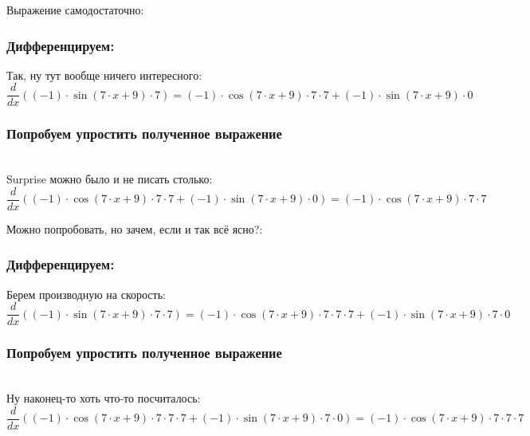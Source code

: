 \documentclass[a4paper,12pt]{article}
\begin{document}
Выражение самодостаточно:

\subsubsection*{Дифференцируем:}

Так, ну тут вообще ничего интересного:
\begin{dmath}\frac{d}{dx}\left((-1)\cdot \operatorname{sin}\left(7\cdot x+ 9\right) \cdot 7\right)=(-1)\cdot \operatorname{cos}\left(7\cdot x+ 9\right) \cdot 7\cdot 7+ (-1)\cdot \operatorname{sin}\left(7\cdot x+ 9\right) \cdot 0\end{dmath}
\subsubsection*{Попробуем упростить полученное выражение}
\\Surprise можно было и не писать столько:\\
\begin{dmath}
	\frac{d}{dx}\left((-1)\cdot \operatorname{cos}\left(7\cdot x+ 9\right) \cdot 7\cdot 7+ (-1)\cdot \operatorname{sin}\left(7\cdot x+ 9\right) \cdot 0\right) = (-1)\cdot \operatorname{cos}\left(7\cdot x+ 9\right) \cdot 7\cdot 7\end{dmath}

Можно попробовать, но зачем, если и так всё ясно?:

\subsubsection*{Дифференцируем:}

Берем производную на скорость:
\begin{dmath}\frac{d}{dx}\left((-1)\cdot \operatorname{sin}\left(7\cdot x+ 9\right) \cdot 7\cdot 7\right)=(-1)\cdot \operatorname{cos}\left(7\cdot x+ 9\right) \cdot 7\cdot 7\cdot 7+ (-1)\cdot \operatorname{sin}\left(7\cdot x+ 9\right) \cdot 7\cdot 0\end{dmath}
\subsubsection*{Попробуем упростить полученное выражение}
\\Ну наконец-то хоть что-то посчиталось:\\
\begin{dmath}
	\frac{d}{dx}\left((-1)\cdot \operatorname{cos}\left(7\cdot x+ 9\right) \cdot 7\cdot 7\cdot 7+ (-1)\cdot \operatorname{sin}\left(7\cdot x+ 9\right) \cdot 7\cdot 0\right) = (-1)\cdot \operatorname{cos}\left(7\cdot x+ 9\right) \cdot 7\cdot 7\cdot 7\end{dmath}
\end{document}
